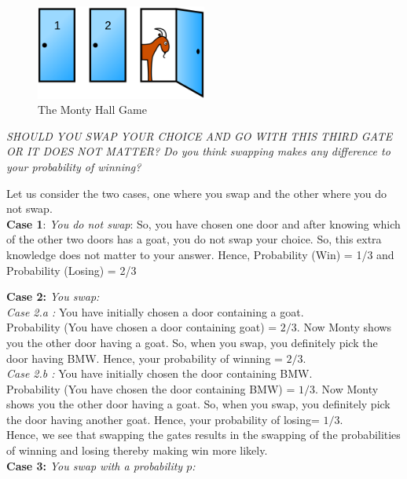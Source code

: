 \documentclass[11pt,fleqn]{book} %
\begin{document}
\begin{figure}[h]
\centering
\includegraphics[width=0.5\textwidth]{monty.png}
\caption{The Monty Hall Game}
\label{monty}
\end{figure}

\textit{SHOULD YOU SWAP YOUR CHOICE AND GO WITH THIS THIRD GATE OR IT DOES NOT MATTER? Do you think swapping makes any difference to your probability of winning?}

Let us consider the two cases, one where you swap and the other where you do not swap. \\

\textbf{Case 1}:\textit{ You do not swap}: So, you have chosen one door and after knowing which of the other two doors has a goat, you do not swap your choice. So, this extra knowledge does not matter to your answer.
Hence, Probability (Win) = 1/3 and Probability (Losing) = 2/3

\textbf{Case 2:} \textit{You swap:}\\ 
\textit{Case 2.a :} You have initially chosen a door containing a goat.\\ 
Probability (You have chosen a door containing goat) = $2/3$. Now Monty shows you the other door having a goat. So, when you swap, you definitely pick the door having BMW. Hence, your probability of winning = $2/3$.\\

\textit{Case 2.b : }You have initially chosen the door containing BMW.\\ 
Probability (You have chosen the door containing BMW) = $1/3$. Now Monty shows you the other door having a goat. So, when you swap, you definitely pick the door having another goat. Hence, your probability of losing= $1/3$.\\

Hence, we see that swapping the gates results in the swapping of the probabilities of winning and losing thereby making win more likely. \\

\textbf{Case 3:} \textit{You swap with a probability $p$:}\\
\end{document}
